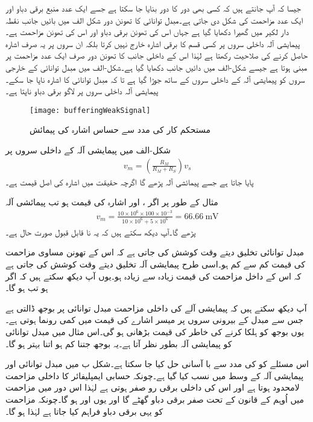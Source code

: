 	جیسا کہ آپ جانتے ہیں کہ کسی بھی دور کا  دور بنایا جا سکتا ہے جسے ایک عدد منبع برقی دباو اور ایک عدد مزاحمت کی شکل دی جاتی ہے۔مبدل توانائی کا تھونن دور شکل  الف میں بائیں جانب نقطہ دار لکیر میں گھیرا دکھایا گیا ہے جہاں  اس کی تھونن برقی دباو اور   اس کی تھونن مزاحمت ہے۔پیمایشی آلہ داخلی سروں پر کسی قسم کا برقی اشارہ خارج نہیں کرتا بلکہ ان سروں پر یہ صرف اشارہ حاصل کرنے کی صلاحیت رکھتا ہے لہٰذا اس کے داخلی جانب کا تھونن دور صرف ایک عدد مزاحمت   پر مبنی ہوتا ہے جیسے شکل-الف میں دائیں جانب دکھایا گیا ہے۔شکل-الف میں مبدل توانائی کے خارجی سروں کو پیمایشی آلہ کے داخلی سروں کے ساتھ جوڑا گیا ہے تا کہ مبدل توانائی کا اشارہ  ناپا جا سکے۔پیمایشی آلہ داخلی سروں  پر لاگو برقی دباو  ناپتا ہے۔
\begin{figure}
\centering
\texttt{[image: bufferingWeakSignal]}
\caption{مستحکم کار کی مدد سے حساس اشارہ کی  پیمائش}
\label{شکل_وسطی_دور_حساس_اشارہ}
\end{figure}
شکل-الف میں پیمایشی آلہ کے داخلی سروں پر
\begin{align*}
v_m=\left(\frac{R_M }{R_M+R_S} \right) v_s
\end{align*}
پایا جاتا ہے جسے پیمائشی آلہ پڑھے گا  اگرچہ حقیقت میں اشارہ کی اصل قیمت   ہے۔

	مثال کے طور پر اگر ، اور اشارہ کی قیمت ہو تب پیمائشی آلہ
\begin{align*}
v_m = \frac{10 \times 10^{6} \times 100 \times 10^{-3}}{10 \times 10^{6}+5 \times 10^{6}}=\SI{66.66}{\milli \volt}
\end{align*}
پڑھے گا۔آپ دیکھ سکتے ہیں کہ یہ نا قابل قبول صورت حال ہے۔

مبدل توانائی تخلیق دیتے وقت کوشش کی جاتی ہے کہ اس کے تھونن مساوی مزاحمت  کی قیمت کم سے کم ہو۔اسی طرح پیمایشی آلہ تخلیق دیتے وقت کوشش کی جاتی ہے کہ اس کے داخل مزاحمت  کی قیمت زیادہ سے زیادہ ہو۔یوں آپ دیکھ سکتے ہیں کہ اگر  ہو تب  ہو گا۔

آپ دیکھ سکتے ہیں کہ پیمایشی آلے کی داخلی مزاحمت مبدل توانائی پر بوجھ ڈالتی ہے جس سے مبدل کے بیرونی سروں پر میسر اشارے کی قیمت میں کمی رونما ہوتی ہے۔یوں بوجھ کو ہلکا کرنے کی خاطر  کی قیمت بڑھانی ہو گی۔اس مثال میں مبدل توانائی کو پیمایشی آلہ بطور    نظر آتا ہے۔یہ بوجھ جتنا کم ہو اتنا بہتر ہو گا۔

اس مسئلے کو  کی مدد سے با آسانی حل کیا جا سکتا ہے۔شکل  ب میں مبدل توانائی اور پیمایشی آلہ کے وسط میں  نسب کیا گیا ہے۔چونکہ حسابی ایمپلیفائر کا داخلی مزاحمت لامحدود ہوتا ہے اور اس کی داخلی برقی رو صفر ہوتی ہے لہٰذا اس دور میں مزاحمت  میں اُوہم کے قانون کے تحت صفر برقی دباو گھٹے گا اور یوں   اور   ہو گا۔چونکہ مزاحمت  کو یہی برقی دباو فراہم کیا جاتا ہے لہٰذا  ہو گا۔



